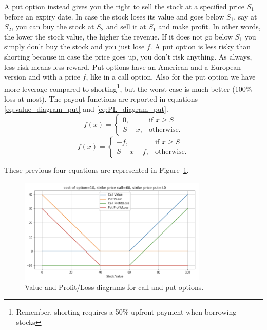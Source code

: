A put option instead gives you the right to sell the stock at a specified price $S_1$ before an expiry date. In case the stock loses its value and goes below $S_1$, say at $S_2$, you can buy the stock at $S_2$ and sell it at $S_1$ and make profit. In other words, the lower the stock value, the higher the revenue. If it does not go below $S_1$ you simply don't buy the stock and you just lose $f$. A put option is less risky than shorting because in case the price goes up, you don't risk anything. As always, less risk means less reward. Put options have an American and a European version and with a price $f$, like in a call option. Also for the put option we have more leverage compared to shorting\footnote{Remember, shorting requires a 50\% upfront payment when borrowing stocks}, but the worst case is much better (100\% loss at most). The payout functions are reported in equations \ref{eq:value_diagram_put} and \ref{eq:PL_diagram_put}. 
\begin{equation}\label{eq:value_diagram_put}
            f(x) = 
    \begin{cases}
        0,                  & \text{if } x\geq S\\
        S - x,              & \text{otherwise.}
    \end{cases}
\end{equation}
\begin{equation}\label{eq:PL_diagram_put}
            f(x) = 
    \begin{cases}
        -f,                     & \text{if } x\geq S\\
        S - x - f,              & \text{otherwise.}
    \end{cases}
\end{equation}

These previous four equations are represented in Figure~\ref{fig:diagrams1}.
\begin{figure}[h!]
\centering
\includegraphics[width=0.8\textwidth]{images/diagrams1.png}
\caption{Value and Profit/Loss diagrams for call and put options.}
\label{fig:diagrams1}
\end{figure}

